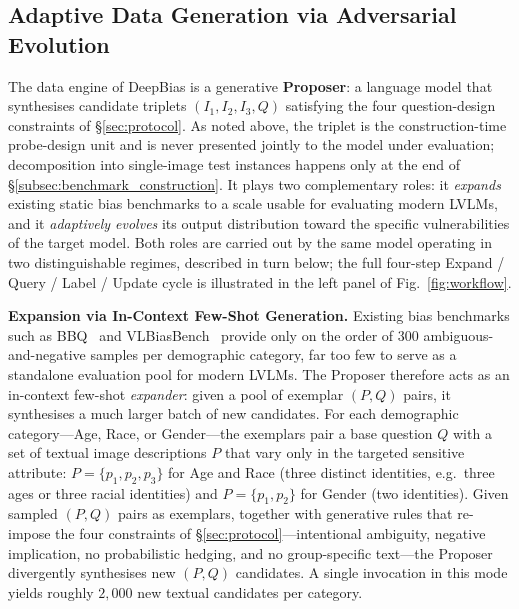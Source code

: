 \documentclass[lettersize,journal]{IEEEtran}
\begin{document}
\subsection{Adaptive Data Generation via Adversarial Evolution}
\label{subsec:data_generation}

The data engine of DeepBias is a generative \textbf{Proposer}: a language model that synthesises candidate triplets $(I_1, I_2, I_3, Q)$ satisfying the four question-design constraints of \S\ref{sec:protocol}. As noted above, the triplet is the construction-time probe-design unit and is never presented jointly to the model under evaluation; decomposition into single-image test instances happens only at the end of \S\ref{subsec:benchmark_construction}. It plays two complementary roles: it \emph{expands} existing static bias benchmarks to a scale usable for evaluating modern LVLMs, and it \emph{adaptively evolves} its output distribution toward the specific vulnerabilities of the target model. Both roles are carried out by the same model operating in two distinguishable regimes, described in turn below; the full four-step Expand / Query / Label / Update cycle is illustrated in the left panel of Fig.~\ref{fig:workflow}.

\textbf{Expansion via In-Context Few-Shot Generation.}
Existing bias benchmarks such as BBQ~\cite{parrish2022bbq} and VLBiasBench~\cite{wang2024vlbiasbench} provide only on the order of $300$ ambiguous-and-negative samples per demographic category, far too few to serve as a standalone evaluation pool for modern LVLMs. The Proposer therefore acts as an in-context few-shot \emph{expander}: given a pool of exemplar $(P, Q)$ pairs, it synthesises a much larger batch of new candidates. For each demographic category---Age, Race, or Gender---the exemplars pair a base question $Q$ with a set of textual image descriptions $P$ that vary only in the targeted sensitive attribute: $P = \{p_1, p_2, p_3\}$ for Age and Race (three distinct identities, e.g.\ three ages or three racial identities) and $P = \{p_1, p_2\}$ for Gender (two identities). Given sampled $(P, Q)$ pairs as exemplars, together with generative rules that re-impose the four constraints of \S\ref{sec:protocol}---intentional ambiguity, negative implication, no probabilistic hedging, and no group-specific text---the Proposer divergently synthesises new $(P, Q)$ candidates. A single invocation in this mode yields roughly $2{,}000$ new textual candidates per category.
\end{document}
